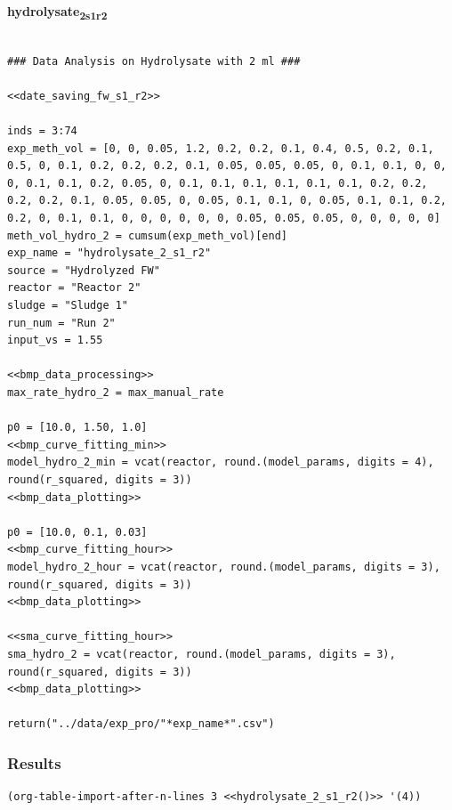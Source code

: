 \documentclass[11pt]{article}
\begin{document}
\textbf{hydrolysate\textsubscript{2}\textsubscript{s1}\textsubscript{r2}}
\begin{verbatim}

### Data Analysis on Hydrolysate with 2 ml ###

<<date_saving_fw_s1_r2>>

inds = 3:74
exp_meth_vol = [0, 0, 0.05, 1.2, 0.2, 0.2, 0.1, 0.4, 0.5, 0.2, 0.1, 0.5, 0, 0.1, 0.2, 0.2, 0.2, 0.1, 0.05, 0.05, 0.05, 0, 0.1, 0.1, 0, 0, 0, 0.1, 0.1, 0.2, 0.05, 0, 0.1, 0.1, 0.1, 0.1, 0.1, 0.1, 0.2, 0.2, 0.2, 0.2, 0.1, 0.05, 0.05, 0, 0.05, 0.1, 0.1, 0, 0.05, 0.1, 0.1, 0.2, 0.2, 0, 0.1, 0.1, 0, 0, 0, 0, 0, 0, 0.05, 0.05, 0.05, 0, 0, 0, 0, 0]
meth_vol_hydro_2 = cumsum(exp_meth_vol)[end]
exp_name = "hydrolysate_2_s1_r2"
source = "Hydrolyzed FW"
reactor = "Reactor 2"
sludge = "Sludge 1"
run_num = "Run 2"
input_vs = 1.55

<<bmp_data_processing>>
max_rate_hydro_2 = max_manual_rate

p0 = [10.0, 1.50, 1.0]
<<bmp_curve_fitting_min>>
model_hydro_2_min = vcat(reactor, round.(model_params, digits = 4), round(r_squared, digits = 3))
<<bmp_data_plotting>>

p0 = [10.0, 0.1, 0.03]
<<bmp_curve_fitting_hour>>
model_hydro_2_hour = vcat(reactor, round.(model_params, digits = 3), round(r_squared, digits = 3))
<<bmp_data_plotting>>

<<sma_curve_fitting_hour>>
sma_hydro_2 = vcat(reactor, round.(model_params, digits = 3), round(r_squared, digits = 3))
<<bmp_data_plotting>>

return("../data/exp_pro/"*exp_name*".csv")
\end{verbatim}

\subsubsection{Results}
\label{sec:org6a227e6}

\begin{verbatim}
(org-table-import-after-n-lines 3 <<hydrolysate_2_s1_r2()>> '(4))
\end{verbatim}
\end{document}
